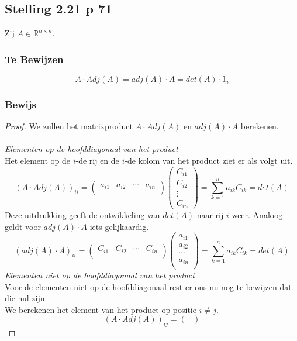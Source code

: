 \documentclass[lineaire_algebra_oplossingen.tex]{subfiles}
\begin{document}
\subsection{Stelling 2.21 p 71}
Zij $A \in \mathbb{R}^{n\times n}$.
\subsubsection*{Te Bewijzen}
\[
A\cdot Adj(A) = adj(A) \cdot A = det(A)\cdot\mathbb{I}_n
\]
\subsubsection*{Bewijs}
\begin{proof}
We zullen het matrixproduct $A\cdot Adj(A)$ en $adj(A) \cdot A$ berekenen.\\\\
\emph{Elementen op de hoofddiagonaal van het product}\\
Het element op de $i$-de rij en de $i$-de kolom van het product ziet er als volgt uit.
\[
(A\cdot Adj(A))_{ii} =
\begin{pmatrix}
a_{i1} & a_{i2}&\cdots&a_{in}\\
\end{pmatrix}
\begin{pmatrix}
C_{i1}\\C_{i2}\\\vdots\\C_{in}
\end{pmatrix}
=
\sum_{k=1}^na_{ik}C_{ik} = det(A)
\]
Deze uitdrukking geeft de ontwikkeling van $det(A)$ naar rij $i$ weer.
Analoog geldt voor $adj(A) \cdot A$ iets gelijkaardig.
\[
(adj(A) \cdot A)_{ii} =
\begin{pmatrix}
C_{i1}&C_{i2}&\cdots&C_{in}\\
\end{pmatrix}
\begin{pmatrix}
a_{i1}\\a_{i2}\\\cdots\\a_{in}\\
\end{pmatrix}
=
\sum_{k=1}^na_{ik}C_{ik} = det(A)
\]
\emph{Elementen niet op de hoofddiagonaal van het product}\\
Voor de elementen niet op de hoofddiagonaal rest er ons nu nog te bewijzen dat die nul zijn.\\
We berekenen het element van het product op positie $i\neq j$.
\[
(A\cdot Adj(A))_{ij} =
\begin{pmatrix}

\end{pmatrix}\]
\end{proof}
\end{document}
